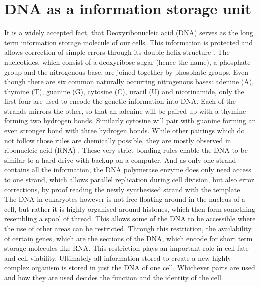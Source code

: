 \section[DNA]{DNA as a information storage unit}
\label{intro-sec:DNA}
It is a widely accepted fact, that Deoxyribonucleic acid (DNA) serves as the long term information storage molecule of our cells. This information is protected and allows correction of simple errors through its double helix structure \cite{Watson1953,Liang1998}. The nucleotides, which consist of a deoxyribose sugar (hence the name), a phosphate group and the nitrogenous base, are joined together by phosphate groups. Even though there are six common naturally occurring nitrogenous bases: adenine (A), thymine (T), guanine (G), cytosine (C), uracil (U) and nicotinamide, only the first four are used to encode the genetic information into DNA. Each of the strands mirrors the other, so that an adenine will be paired up with a thymine forming two hydrogen bonds. Similarly cytosine will pair with guanine forming an even stronger bond with three hydrogen bonds. While other pairings which do not follow those rules are chemically possible, they are mostly observed in ribonucleic acid (RNA) \cite{Sinden1994}. These very strict bonding rules enable the DNA to be similar to a hard drive with backup on a computer. And as only one strand contains all the information, the DNA polymerase enzyme does only need access to one strand, which allows parallel replication during cell division, but also error corrections, by proof reading the newly synthesised strand with the template.
The DNA in eukaryotes however is not free floating around in the nucleus of a cell, but rather it is highly organised around histones, which then form something resembling a spool of thread. This allows some of the DNA to be accessible where the use of other areas can be restricted. Through this restriction, the availability of certain genes, which are the sections of the DNA, which encode for short term storage molecules like RNA. This restriction plays an important role in cell fate and cell viability. Ultimately all information stored to create a new highly complex organism is stored in just the DNA of one cell. Whichever parts are used and how they are used decides the function and the identity of the cell.
